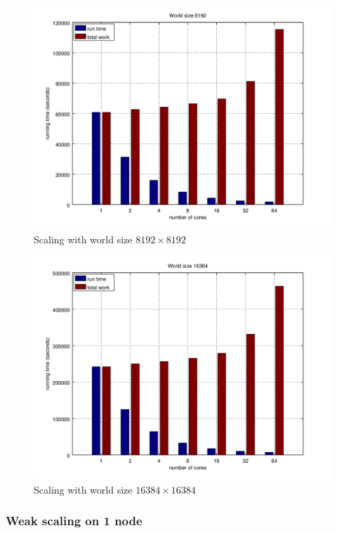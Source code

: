 \documentclass[a4paper]{article}
\begin{document}
\begin{figure}
    \centering
    \includegraphics[width=\textwidth]{scaling-8192}
    \caption{Scaling with world size $8192 \times 8192$}
\end{figure}

\begin{figure}
    \centering
    \includegraphics[width=\textwidth]{scaling-16384}
    \caption{Scaling with world size $16384 \times 16384$}
\end{figure}

\subsubsection{Weak scaling on 1 node}
\end{document}
